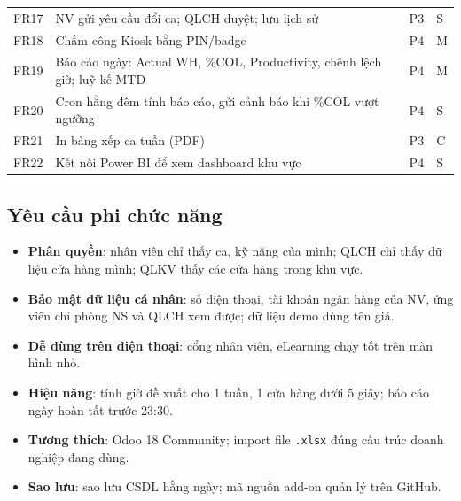\documentclass[12pt,a4paper,oneside]{report}
\begin{document}
\begin{longtable}{C{1.1cm}L{9.4cm}C{1cm}C{1.6cm}}
FR17 & NV gửi yêu cầu đổi ca; QLCH duyệt; lưu lịch sử & P3 & S \\
FR18 & Chấm công Kiosk bằng PIN/badge & P4 & M \\
FR19 & Báo cáo ngày: Actual WH, \%COL, Productivity, chênh lệch giờ; luỹ kế MTD & P4 & M \\
FR20 & Cron hằng đêm tính báo cáo, gửi cảnh báo khi \%COL vượt ngưỡng & P4 & S \\
FR21 & In bảng xếp ca tuần (PDF) & P3 & C \\
FR22 & Kết nối Power BI để xem dashboard khu vực & P4 & S \\
\bottomrule
\end{longtable}

\subsection{Yêu cầu phi chức năng}
\begin{itemize}
\item \textbf{Phân quyền}: nhân viên chỉ thấy ca, kỹ năng của mình; QLCH chỉ thấy dữ liệu cửa hàng mình; QLKV thấy các cửa hàng trong khu vực.
\item \textbf{Bảo mật dữ liệu cá nhân}: số điện thoại, tài khoản ngân hàng của NV, ứng viên chỉ phòng NS và QLCH xem được; dữ liệu demo dùng tên giả.
\item \textbf{Dễ dùng trên điện thoại}: cổng nhân viên, eLearning chạy tốt trên màn hình nhỏ.
\item \textbf{Hiệu năng}: tính giờ đề xuất cho 1 tuần, 1 cửa hàng dưới 5 giây; báo cáo ngày hoàn tất trước 23:30.
\item \textbf{Tương thích}: Odoo 18 Community; import file \texttt{.xlsx} đúng cấu trúc doanh nghiệp đang dùng.
\item \textbf{Sao lưu}: sao lưu CSDL hằng ngày; mã nguồn add-on quản lý trên GitHub.
\end{itemize}
\end{document}
